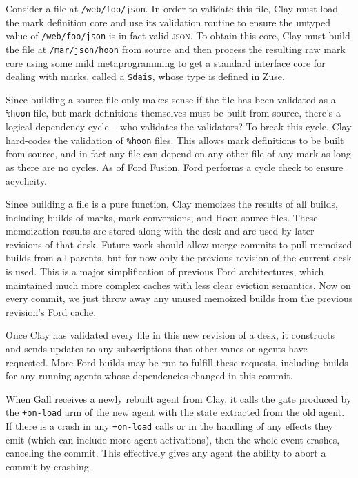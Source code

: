 \documentclass[twoside]{article}
\begin{document}
Consider a file at \lstinline[style=inlinecode]{/web/foo/json}. In order to validate this file, Clay must load the mark definition core and use its validation routine to ensure the untyped value of \lstinline[style=inlinecode]{/web/foo/json} is in fact valid \textsc{json}. To obtain this core, Clay must build the file at \lstinline[style=inlinecode]{/mar/json/hoon} from source and then process the resulting raw mark core using some mild metaprogramming to get a standard interface core for dealing with marks, called a \lstinline[style=inlinecode]{$dais}, whose type is defined in Zuse.

Since building a source file only makes sense if the file has been validated as a \lstinline[style=inlinecode]{%hoon} file, but mark definitions themselves must be built from source, there's a logical dependency cycle – who validates the validators? To break this cycle, Clay hard-codes the validation of \lstinline[style=inlinecode]{%hoon} files. This allows mark definitions to be built from source, and in fact any file can depend on any other file of any mark as long as there are no cycles. As of Ford Fusion, Ford performs a cycle check to ensure acyclicity.

Since building a file is a pure function, Clay memoizes the results of all builds, including builds of marks, mark conversions, and Hoon source files. These memoization results are stored along with the desk and are used by later revisions of that desk. Future work should allow merge commits to pull memoized builds from all parents, but for now only the previous revision of the current desk is used. This is a major simplification of previous Ford architectures, which maintained much more complex caches with less clear eviction semantics. Now on every commit, we just throw away any unused memoized builds from the previous revision's Ford cache.

Once Clay has validated every file in this new revision of a desk, it constructs and sends updates to any subscriptions that other vanes or agents have requested. More Ford builds may be run to fulfill these requests, including builds for any running agents whose dependencies changed in this commit.

When Gall receives a newly rebuilt agent from Clay, it calls the gate produced by the \lstinline[style=inlinecode]{+on-load} arm of the new agent with the state extracted from the old agent. If there is a crash in any \lstinline[style=inlinecode]{+on-load} calls or in the handling of any effects they emit (which can include more agent activations), then the whole event crashes, canceling the commit. This effectively gives any agent the ability to abort a commit by crashing.
\end{document}
